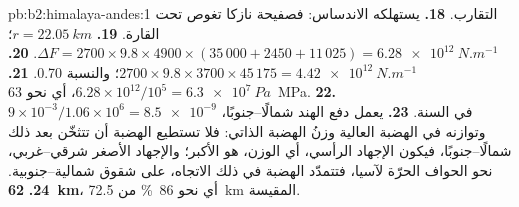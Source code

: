 \begin{solution}{pb:b2:himalaya-andes:1}
التقارب.
\textbf{18.} يستهلكه الاندساس: فصفيحة نازكا تغوص تحت القارة.
\textbf{19.} $r = \qty{22.05}{km}$؛ $\Delta F = 2700\times9.8\times4900\times(35\,000 + 2450
+ 11\,025) = \qty{6.28e12}{N.m^{-1}}$.
\textbf{20.} $2700\times9.8\times3700\times45\,175 = \qty{4.42e12}{N.m^{-1}}$؛ والنسبة
0.70.
\textbf{21.} $6.28\times10^{12}/10^{5} = \qty{6.3e7}{Pa}$، أي نحو \qty{63}{MPa}.
\textbf{22.} $9\times10^{-3}/1.06\times10^{6} = \num{8.5e-9}$ في السنة.
\textbf{23.} يعمل دفع الهند شمالًا--جنوبًا، وتوازنه في الهضبة العالية
وزنُ الهضبة الذاتي: فلا تستطيع الهضبة أن تتثخّن بعد ذلك شمالًا--جنوبًا، فيكون الإجهاد الرأسي،
أي الوزن، هو الأكبر؛ والإجهاد الأصغر شرقي--غربي، نحو الحواف الحرّة لآسيا،
فتتمدّد الهضبة في ذلك الاتجاه، على شقوق شمالية--جنوبية.
\textbf{24.} \textbf{\qty[text-series-to-math=true]{62}{km}}، أي نحو \qty{86}{\percent} من
\qty{72.5}{km} المقيسة.
\end{solution}
